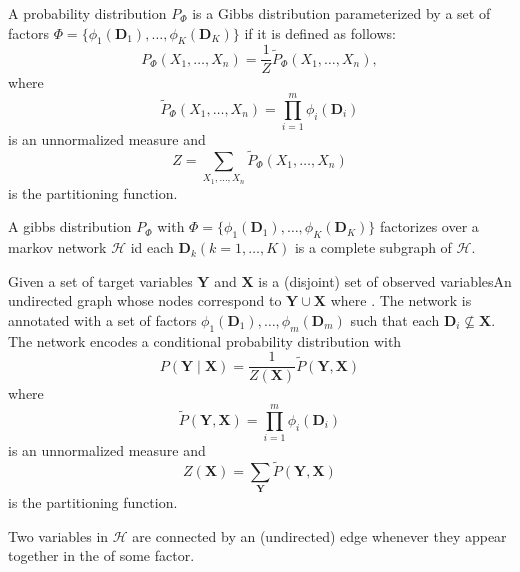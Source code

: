 {%
  A \gls{probability distribution} $P_{\Phi}$ is a Gibbs distribution parameterized by a set of \glspl{factor} $\Phi=\{\phi_1(\bm{D}_1),\dots,\phi_K(\bm{D}_K)\}$ if it is defined as follows:
  \begin{equation*}
    P_{\Phi}(X_1,\dots,X_n)=\frac{1}{Z}\tilde{P}_{\Phi}(X_1,\dots,X_n),
  \end{equation*}
  where
  \begin{equation*}
    \tilde{P}_{\Phi}(X_1,\dots,X_n)=\prod_{i=1}^{m}\phi_i(\bm{D}_i)
  \end{equation*}
  is an unnormalized measure and
  \begin{equation*}
    Z=\sum_{X_1,\ldots,X_n}\tilde{P}_{\Phi}(X_1,\dots,X_n)
  \end{equation*}
  is the \gls{partitioning function}.
}

{%
  A \gls{gibbs distribution} $P_{\Phi}$ with $\Phi=\{\phi_1(\bm{D}_1),\dots,\phi_K(\bm{D}_K)\}$ factorizes over a \gls{markov
network} $\mathcal{H}$ id each $\bm{D}_{k}(k=1,\dots,K)$ is a \gls{complete subgraph} of $\mathcal{H}$.
}

{%
  Given a set of \glspl{target variable} $\bm{Y}$ and $\bm{X}$ is a (disjoint) set of \glspl{observed variable}An undirected \gls{graph} whose \glspl{node} correspond to $\bm{Y}\cup\bm{X}$ where . The network is annotated with a set of \glspl{factor} $\phi_1(\bm{D}_1),\dots,\phi_m(\bm{D}_m)$ such that each $\bm{D}_i\nsubseteq\bm{X}$. The network encodes a \gls{conditional probability distribution} with
  \begin{equation*}
    P(\bm{Y}\mid\bm{X})=\frac{1}{Z(\bm{X})}\tilde{P}(\bm{Y},\bm{X})
  \end{equation*}
  where
  \begin{equation*}
    \tilde{P}(\bm{Y},\bm{X})=\prod_{i=1}^{m}\phi_i(\bm{D}_i)
  \end{equation*}
  is an unnormalized measure and
  \begin{equation*}
    Z(\bm{X})=\sum_{\bm{Y}}\tilde{P}(\bm{Y},\bm{X})
  \end{equation*}
  is the \gls{partitioning function}.

  Two variables in $\mathcal{H}$ are connected by an (undirected) \gls{edge} whenever they appear together in the  of some \gls{factor}.
}

